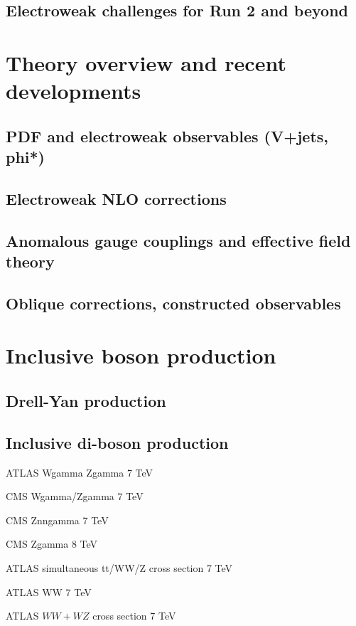 \documentclass[12pt]{iopart}
\begin{document}
\subsection{Electroweak challenges for Run 2 and beyond}

\section{Theory overview and recent developments}
\subsection{PDF and electroweak observables (V+jets, phi*)}
\subsection{Electroweak NLO corrections}
\subsection{Anomalous gauge couplings and effective field theory}
\subsection{Oblique corrections, constructed observables}


\section{Inclusive boson production}
\subsection{Drell-Yan production}

\subsection{Inclusive di-boson production}

ATLAS Wgamma Zgamma 7 TeV~\cite{Aad:2013izg}

CMS Wgamma/Zgamma 7 TeV~\cite{Chatrchyan:2013fya}

CMS Znngamma 7 TeV~\cite{Chatrchyan:2013nda}

CMS Zgamma 8 TeV~\cite{Khachatryan:2015kea}


ATLAS simultaneous tt/WW/Z cross section 7 TeV~\cite{Aad:2014jra}

ATLAS WW 7 TeV~\cite{ATLAS:2012mec}

ATLAS $WW+WZ$ cross section 7 TeV~\cite{Aad:2014mda}
\end{document}
